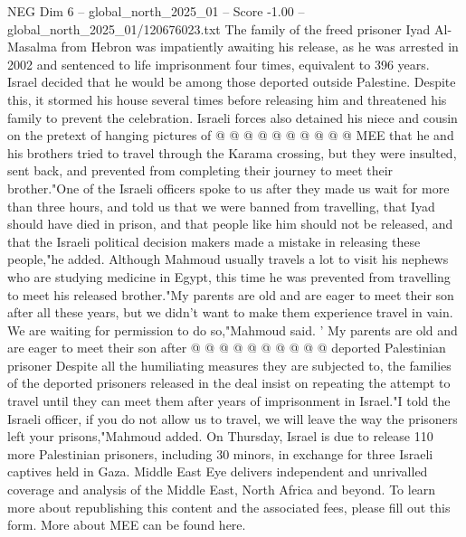 \begin{textsample}{NEG Dim 6 – global\_north\_2025\_01 – Score -1.00 – global\_north\_2025\_01/120676023.txt}
The family of the freed prisoner Iyad Al-Masalma from Hebron was impatiently awaiting his release, as he was arrested in 2002 and sentenced to life imprisonment four times, equivalent to 396 years.
Israel decided that he would be among those deported outside Palestine.
Despite this, it stormed his house several times before releasing him and threatened his family to prevent the celebration.
Israeli forces also detained his niece and cousin on the pretext of hanging pictures of @ @ @ @ @ @ @ @ @ @ MEE that he and his brothers tried to travel through the Karama crossing, but they were insulted, sent back, and prevented from completing their journey to meet their brother."One of the Israeli officers spoke to us after they made us wait for more than three hours, and told us that we were banned from travelling, that Iyad should have died in prison, and that people like him should not be released, and that the Israeli political decision makers made a mistake in releasing these people,"he added.
Although Mahmoud usually travels a lot to visit his nephews who are studying medicine in Egypt, this time he was prevented from travelling to meet his released brother."My parents are old and are eager to meet their son after all these years, but we didn't want to make them experience travel in vain.
We are waiting for permission to do so,"Mahmoud said. ' My parents are old and are eager to meet their son after @ @ @ @ @ @ @ @ @ @ deported Palestinian prisoner Despite all the humiliating measures they are subjected to, the families of the deported prisoners released in the deal insist on repeating the attempt to travel until they can meet them after years of imprisonment in Israel."I told the Israeli officer, if you do not allow us to travel, we will leave the way the prisoners left your prisons,"Mahmoud added.
On Thursday, Israel is due to release 110 more Palestinian prisoners, including 30 minors, in exchange for three Israeli captives held in Gaza.
Middle East Eye delivers independent and unrivalled coverage and analysis of the Middle East, North Africa and beyond.
To learn more about republishing this content and the associated fees, please fill out this form.
More about MEE can be found here.

\end{textsample}
